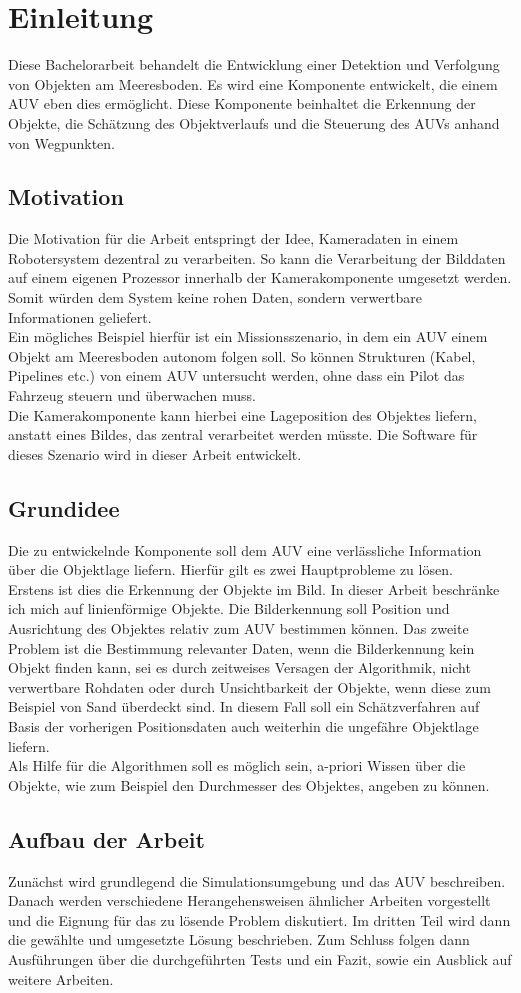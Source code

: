 \section{Einleitung}
Diese Bachelorarbeit behandelt die Entwicklung einer Detektion und Verfolgung von Objekten am Meeresboden. Es wird eine Komponente entwickelt, die einem AUV eben dies ermöglicht. Diese Komponente beinhaltet die Erkennung der Objekte, die Schätzung des Objektverlaufs und die Steuerung des AUVs anhand von Wegpunkten.
\subsection{Motivation}
Die Motivation für die Arbeit entspringt der Idee, Kameradaten in einem Robotersystem dezentral zu verarbeiten. So kann die Verarbeitung der Bilddaten auf einem eigenen Prozessor innerhalb der Kamerakomponente umgesetzt werden. Somit würden dem System keine rohen Daten, sondern verwertbare Informationen geliefert.\\
Ein mögliches Beispiel hierfür ist ein Missionsszenario, in dem ein AUV einem Objekt am Meeresboden autonom folgen soll. So können Strukturen (Kabel, Pipelines etc.) von einem AUV untersucht werden, ohne dass ein Pilot das Fahrzeug steuern und überwachen muss.\\
Die Kamerakomponente kann hierbei eine Lageposition des Objektes liefern, anstatt eines Bildes, das zentral verarbeitet werden müsste. Die Software für dieses Szenario wird in dieser Arbeit entwickelt.\\

\subsection{Grundidee}
Die zu entwickelnde Komponente soll dem AUV eine verlässliche Information über die Objektlage liefern. Hierfür gilt es zwei Hauptprobleme zu lösen.\\
Erstens ist dies die Erkennung der Objekte im Bild. In dieser Arbeit beschränke ich mich auf linienförmige Objekte. Die Bilderkennung soll Position und Ausrichtung des Objektes relativ zum AUV bestimmen können.
Das zweite Problem ist die Bestimmung relevanter Daten, wenn die Bilderkennung kein Objekt finden kann, sei es durch zeitweises Versagen der Algorithmik, nicht verwertbare Rohdaten oder durch Unsichtbarkeit der Objekte, wenn diese zum Beispiel von Sand überdeckt sind.
In diesem Fall soll ein Schätzverfahren auf Basis der vorherigen Positionsdaten auch weiterhin die ungefähre Objektlage liefern.\\
Als Hilfe für die Algorithmen soll es möglich sein, a-priori Wissen über die Objekte, wie zum Beispiel den Durchmesser des Objektes, angeben zu können.
\subsection{Aufbau der Arbeit}
Zunächst wird grundlegend die Simulationsumgebung und das AUV beschreiben. Danach werden verschiedene Herangehensweisen ähnlicher Arbeiten vorgestellt und die Eignung für das zu lösende Problem diskutiert.
Im dritten Teil wird dann die gewählte und umgesetzte Lösung beschrieben. Zum Schluss folgen dann Ausführungen über die durchgeführten Tests und ein Fazit, sowie ein Ausblick auf weitere Arbeiten.